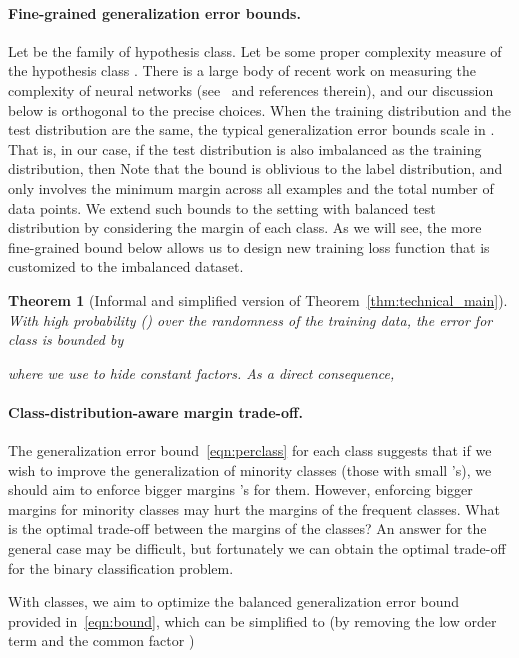 \documentclass{article}
\newtheorem{theorem}{Theorem}
\begin{document}
\paragraph{Fine-grained generalization error bounds.}
Let  be the family of hypothesis class. Let  be some proper complexity measure of the hypothesis class . There is a large body of recent work on measuring the complexity of neural networks (see~\citep{bartlett2017spectrally,golowich2017size,wei2019data} and references therein), and our discussion below is orthogonal to the precise choices. When the training distribution and the test distribution are the same, the typical generalization error bounds scale in . That is, in our case, if the test distribution is also imbalanced as the training distribution, then  
Note that the bound is oblivious to the label distribution, and only involves the minimum margin across all examples and the total number of data points. We extend such bounds to the setting with balanced test distribution by considering the margin of each class. As we will see, the more fine-grained bound below allows us to design new training loss function that is customized to the imbalanced dataset. 

\begin{theorem}[Informal and simplified version of Theorem~\ref{thm:technical_main}]\label{thm:informal_main}
	With high probability () over the randomness of the training data, the error  for class  is bounded by 
	
	where we use  to hide constant factors. As a direct consequence, 
	
\end{theorem}

\paragraph{Class-distribution-aware margin trade-off.}
The generalization error bound~\eqref{eqn:perclass} for each class suggests that if we wish to improve the generalization of minority classes (those with small 's), we should aim to enforce bigger margins 's for them. However, enforcing bigger margins for minority classes may hurt the margins of the frequent classes. What is the optimal trade-off between the margins of the classes? An answer for the general case may be difficult, but fortunately we can obtain the optimal trade-off for the binary classification problem. 

With  classes, we aim to optimize the balanced generalization error bound provided in~\eqref{eqn:bound}, which can be simplified to (by removing the low order term  and the common factor )
\end{document}
